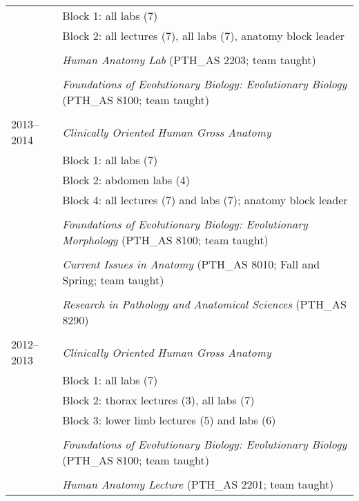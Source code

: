 \begin{longtable}{@{}lX@{}}
    & Block 1: all labs (7)\\
    & Block 2: all lectures (7), all labs (7), anatomy block leader\\
    \\
    & \textit{Human Anatomy Lab} (PTH\_AS 2203; team taught)\\
    \\
    & \textit{Foundations of Evolutionary Biology: Evolutionary Biology} (PTH\_AS 8100; team taught)\\
    \\
  2013--2014 & \textit{Clinically Oriented Human Gross Anatomy}\\
    & Block 1: all labs (7)\\
    & Block 2: abdomen labs (4)\\
    & Block 4: all lectures (7) and labs (7); anatomy block leader\\
    \\
    & \textit{Foundations of Evolutionary Biology: Evolutionary Morphology} (PTH\_AS 8100; team taught)\\
    \\
    & \textit{Current Issues in Anatomy} (PTH\_AS 8010; Fall and Spring; team taught)\\
    \\
    & \textit{Research in Pathology and Anatomical Sciences} (PTH\_AS 8290)\\
    \\
  2012--2013 & \textit{Clinically Oriented Human Gross Anatomy}\\
    & Block 1: all labs (7)\\
    & Block 2: thorax lectures (3), all labs (7)\\
    & Block 3: lower limb lectures (5) and labs (6)\\
    \\
    & \textit{Foundations of Evolutionary Biology: Evolutionary Biology} (PTH\_AS 8100; team taught)\\
    \\
    & \textit{Human Anatomy Lecture} (PTH\_AS 2201; team taught)\\
\end{longtable}
